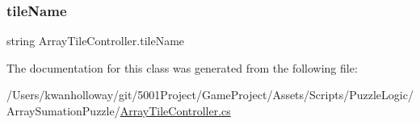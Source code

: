 \mbox{\label{class_array_tile_controller_a9f7d6d4fd87723a3e91209f35bc8d5f6}} 
\subsubsection{\texorpdfstring{tile\+Name}{tileName}}
{\footnotesize\ttfamily string Array\+Tile\+Controller.\+tile\+Name}



The documentation for this class was generated from the following file\+:\begin{DoxyCompactItemize}
\item 
/\+Users/kwanholloway/git/5001\+Project/\+Game\+Project/\+Assets/\+Scripts/\+Puzzle\+Logic/\+Array\+Sumation\+Puzzle/\hyperlink{_array_tile_controller_8cs}{Array\+Tile\+Controller.\+cs}\end{DoxyCompactItemize}
